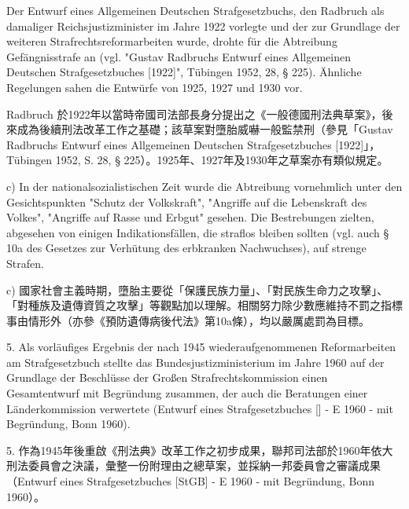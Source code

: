 \documentclass[12pt]{article}
\begin{document}
\syncleft
\begin{sourcepara}
Der Entwurf eines Allgemeinen Deutschen Strafgesetzbuchs, den Radbruch als damaliger Reichsjustizminister im Jahre 1922 vorlegte und der zur Grundlage der weiteren Strafrechtsreformarbeiten wurde, drohte für die Abtreibung Gefängnisstrafe an (vgl. "Gustav Radbruchs Entwurf eines Allgemeinen Deutschen Strafgesetzbuches [1922]", Tübingen 1952, \abbrS{} 28, § 225). Ähnliche Regelungen sahen die Entwürfe von 1925, 1927 und 1930 vor.
\end{sourcepara}
\begin{transpara}
Radbruch 於1922年以當時帝國司法部長身分提出之《一般德國刑法典草案》，後來成為後續刑法改革工作之基礎；該草案對墮胎威嚇一般監禁刑（參見「Gustav Radbruchs Entwurf eines Allgemeinen Deutschen Strafgesetzbuches [1922]」，Tübingen 1952, S. 28, § 225）。1925年、1927年及1930年之草案亦有類似規定。
\end{transpara}

\syncleft
\begin{sourcepara}
c) In der nationalsozialistischen Zeit wurde die Abtreibung vornehmlich unter den Gesichtspunkten "Schutz der Volkskraft", "Angriffe auf die Lebenskraft des Volkes", "Angriffe auf Rasse und Erbgut" gesehen. Die Bestrebungen zielten, abgesehen von einigen Indikationsfällen, die straflos bleiben sollten (vgl. auch § 10a des Gesetzes zur Verhütung des erbkranken Nachwuchses), auf strenge Strafen.
\end{sourcepara}
\begin{transpara}
c) 國家社會主義時期，墮胎主要從「保護民族力量」、「對民族生命力之攻擊」、「對種族及遺傳資質之攻擊」等觀點加以理解。相關努力除少數應維持不罰之指標事由情形外（亦參《預防遺傳病後代法》第10a條），均以嚴厲處罰為目標。
\end{transpara}

\syncleft
\begin{sourcepara}
5. Als vorläufiges Ergebnis der nach 1945 wiederaufgenommenen Reformarbeiten am Strafgesetzbuch stellte das Bundesjustizministerium im Jahre 1960 auf der Grundlage der Beschlüsse der Großen Strafrechtskommission einen Gesamtentwurf mit Begründung zusammen, der auch die Beratungen einer Länderkommission verwertete (Entwurf eines Strafgesetzbuches [\abbrStGB{}] - E 1960 - mit Begründung, Bonn 1960).
\end{sourcepara}
\begin{transpara}
5. 作為1945年後重啟《刑法典》改革工作之初步成果，聯邦司法部於1960年依大刑法委員會之決議，彙整一份附理由之總草案，並採納一邦委員會之審議成果（Entwurf eines Strafgesetzbuches [StGB] - E 1960 - mit Begründung, Bonn 1960）。
\end{transpara}
\end{document}
